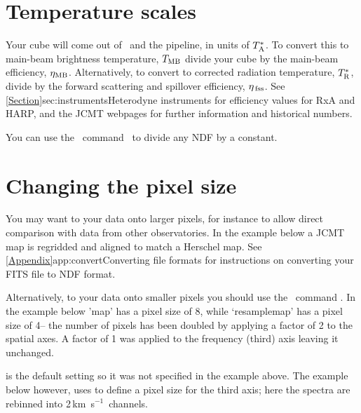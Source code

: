 \documentclass[11pt,oneside,chapters]{starlink}
\providecommand{\sqorst}{\xref{\task{sqorst}}{sun95}{SQORST}}
\newcommand{\kms}{\mbox{$\,$km~s$^{-1}$}}   %
\newcommand{\kms}{\,km~s$^{-1}$}   %
\begin{document}
\section{Temperature scales}
\label{sec:mult}

Your cube will come out of \makecube\, and the pipeline, in units of
$T_{\textnormal{A}}^*$. To convert this to main-beam brightness temperature, $T_{\textnormal{MB}}$
divide your cube by the main-beam efficiency, $\eta_{\textnormal{MB}}$. Alternatively,
to convert to corrected radiation temperature, $T_{\textnormal{R}}^*$, divide by the forward
scattering and spillover efficiency, $\eta_{\textnormal{\,fss}}$.  See
\cref{Section}{sec:instruments}{Heterodyne instruments} for efficiency
values for RxA and HARP, and the JCMT webpages for further information
and historical numbers.

You can use the \Kappa\ command \cdiv\ to divide any NDF by a constant.

\begin{terminalv}
\end{terminalv}

\section{Changing the pixel size}
\label{sec:rebin}

You may want to  your data onto
larger pixels, for instance to
allow direct comparison with data from other observatories. In the
example below a JCMT map is regridded and aligned to match a Herschel
map. See \cref{Appendix}{app:convert}{Converting file formats} for
instructions on converting your FITS file to NDF format.
\begin{terminalv}
\end{terminalv}

Alternatively, to  your data onto smaller
pixels you should
use the \Kappa\ command \sqorst. In the example below 'map' has a
pixel size of 8\arcsec, while `resamplemap' has a pixel size of 4\arcsec --
the number of pixels has been doubled by applying a factor of 2 to the
spatial axes. A factor of 1 was applied to the frequency (third) axis
leaving it unchanged.
\begin{terminalv}
\end{terminalv}
 is the default setting so it was not specified in
the example above. The example below however, uses
 to define a pixel size for the third axis;
here the spectra are rebinned into 2\kms\ channels.
\begin{terminalv}
\end{terminalv}
\end{document}
